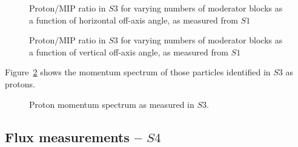 	\begin{figure}[!ht]
		\begin{minipage}[t]{0.48\textwidth}
			\begin{adjustbox}{max totalsize={\textwidth}{.35\textheight}, center}
				
			\end{adjustbox}
			\caption{Proton/MIP ratio in $S3$ for varying numbers of moderator blocks as a function of horizontal off-axis angle, as measured from $S1$}
			\label{fig:propiratio_s3_horz}
		\end{minipage}
		\hspace{0.3cm}
		\begin{minipage}[t]{0.48\textwidth}
			\begin{adjustbox}{max totalsize={\textwidth}{.35\textheight}, center}
				
			\end{adjustbox}
			\caption{Proton/MIP ratio in $S3$ for varying numbers of moderator blocks as a function of vertical off-axis angle, as measured from $S1$}
			\label{fig:propiratio_s3_vert}
		\end{minipage}	
	\end{figure}

	Figure~\ref{fig:s3promom} shows the momentum spectrum of those particles identified in $S3$ as protons.

	\begin{figure}[ht]
		\centering
		\begin{adjustbox}{max totalsize={0.8\textwidth}, center}
			
		\end{adjustbox}
		\caption{Proton momentum spectrum as measured in $S3$.}
		\label{fig:s3promom}
	\end{figure}

	\subsection{Flux measurements -- $S4$}

   
